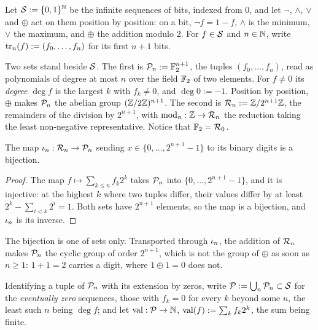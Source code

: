 Let $\mathcal{S} := \lbrace 0, 1 \rbrace^{\mathbb{N}}$ be the infinite sequences of bits,
indexed from $0$,
and let $\neg$, $\wedge$, $\vee$ and $\oplus$ act on them position by position:
on a bit, $\neg f = 1 - f$, $\wedge$ is the minimum, $\vee$ the maximum,
and $\oplus$ the addition modulo $2$.
For $f \in \mathcal{S}$ and $n \in \mathbb{N}$,
write $\mathrm{tr}_{n}(f) := (f_0, \dots, f_n)$ for its first $n+1$ bits.

Two sets stand beside $\mathcal{S}$.
The first is $\mathcal{P}_{n} := \mathbb{F}_{2}^{n+1}$, the tuples $(f_0, \dots, f_n)$,
read as polynomials of degree at most $n$ over the field $\mathbb{F}_{2}$ of two elements.
For $f \neq 0$ its \emph{degree} $\deg f$ is the largest $k$ with $f_k \neq 0$,
and $\deg 0 := -1$.
Position by position, $\oplus$ makes $\mathcal{P}_{n}$ the abelian group
$(\mathbb{Z}/2\mathbb{Z})^{n+1}$.
The second is $\mathcal{R}_{n} := \mathbb{Z}/2^{n+1}\mathbb{Z}$, the remainders of the division by $2^{n+1}$,
with $\mathrm{mod}_{n} : \mathbb{Z} \to \mathcal{R}_{n}$ the reduction taking the least non-negative
representative.
Notice that $\mathbb{F}_{2} = \mathcal{R}_{0}$.

\begin{prop}\label{prop.binaryDigits}
 The map $\iota_{n} : \mathcal{R}_{n} \to \mathcal{P}_{n}$ sending
 $x \in \lbrace 0, \dots, 2^{n+1} - 1 \rbrace$ to its binary digits is a bijection.
\end{prop}
\begin{proof}
 The map $f \mapsto \sum_{k \leq n} f_k 2^k$ takes $\mathcal{P}_{n}$ into
 $\lbrace 0, \dots, 2^{n+1} - 1 \rbrace$, and it is injective:
 at the highest $k$ where two tuples differ, their values differ by at least
 $2^k - \sum_{i < k} 2^i = 1$.
 Both sets have $2^{n+1}$ elements,
 so the map is a bijection, and $\iota_{n}$ is its inverse.
\end{proof}

The bijection is one of sets only.
Transported through $\iota_{n}$, the addition of $\mathcal{R}_{n}$ makes
$\mathcal{P}_{n}$ the cyclic group of order $2^{n+1}$,
which is not the group of $\oplus$ as soon as $n \geq 1$:
$1 + 1 = 2$ carries a digit, where $1 \oplus 1 = 0$ does not.

Identifying a tuple of $\mathcal{P}_{n}$ with its extension by zeros,
write $\mathcal{P} := \bigcup_{n} \mathcal{P}_{n} \subset \mathcal{S}$ for the
\emph{eventually zero} sequences, those with $f_k = 0$ for every $k$ beyond some $n$,
the least such $n$ being $\deg f$;
and let $\mathrm{val} : \mathcal{P} \to \mathbb{N}$, $\mathrm{val}(f) := \sum_{k} f_k 2^k$,
the sum being finite.

